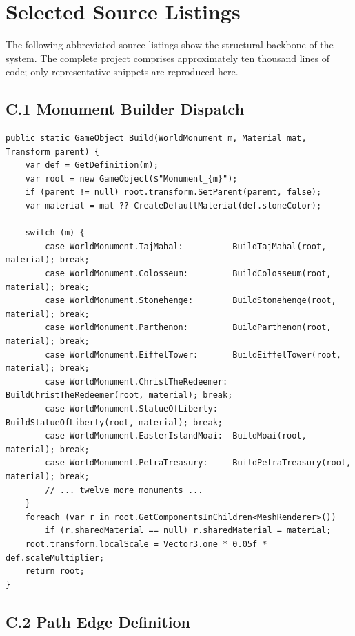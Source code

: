 \chapter{Selected Source Listings}

The following abbreviated source listings show the structural backbone of the system. The complete project comprises approximately ten thousand lines of code; only representative snippets are reproduced here.

\section*{C.1 Monument Builder Dispatch}

\begin{lstlisting}[language={[Sharp]C}]
public static GameObject Build(WorldMonument m, Material mat, Transform parent) {
    var def = GetDefinition(m);
    var root = new GameObject($"Monument_{m}");
    if (parent != null) root.transform.SetParent(parent, false);
    var material = mat ?? CreateDefaultMaterial(def.stoneColor);

    switch (m) {
        case WorldMonument.TajMahal:          BuildTajMahal(root, material); break;
        case WorldMonument.Colosseum:         BuildColosseum(root, material); break;
        case WorldMonument.Stonehenge:        BuildStonehenge(root, material); break;
        case WorldMonument.Parthenon:         BuildParthenon(root, material); break;
        case WorldMonument.EiffelTower:       BuildEiffelTower(root, material); break;
        case WorldMonument.ChristTheRedeemer: BuildChristTheRedeemer(root, material); break;
        case WorldMonument.StatueOfLiberty:   BuildStatueOfLiberty(root, material); break;
        case WorldMonument.EasterIslandMoai:  BuildMoai(root, material); break;
        case WorldMonument.PetraTreasury:     BuildPetraTreasury(root, material); break;
        // ... twelve more monuments ...
    }
    foreach (var r in root.GetComponentsInChildren<MeshRenderer>())
        if (r.sharedMaterial == null) r.sharedMaterial = material;
    root.transform.localScale = Vector3.one * 0.05f * def.scaleMultiplier;
    return root;
}
\end{lstlisting}

\section*{C.2 Path Edge Definition}

